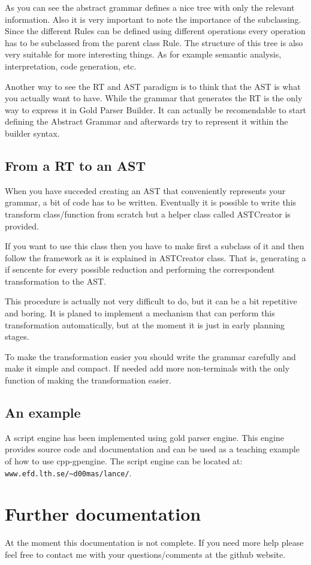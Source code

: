 \documentclass[a4paper]{article}
\begin{document}
As you can see the abstract grammar defines a nice tree with only the relevant information. Also it is very important to note the importance of the subclassing. Since the different Rules can be defined using different operations every operation has to be subclassed from the parent class Rule. The structure of this tree is also very suitable for more interesting things. As for example semantic analysis, interpretation, code generation, etc.

Another way to see the RT and AST paradigm is to think that the AST is what you actually want to have. While the grammar that generates the RT is the only way to express it in Gold Parser Builder. It can actually be recomendable to start defining the Abstract Grammar and afterwards try to represent it within the builder syntax.

\subsection {From a RT to an AST}
When you have succeded creating an AST that conveniently represents your grammar, a bit of code has to be written. Eventually it is possible to write this transform class/function from scratch but a helper class called ASTCreator is provided. 

If you want to use this class then you have to make first a subclass of it and then follow the framework as it is explained in ASTCreator class. That is, generating a if sencente for every possible reduction and performing the correspondent transformation to the AST.

This procedure is actually not very difficult to do, but it can be a bit repetitive and boring. It is planed to implement a mechanism that can perform this transformation automatically, but at the moment it is just in early planning stages.

To make the transformation easier you should write the grammar carefully and make it simple and compact. If needed add more non-terminals with the only function of making the transformation easier.

\subsection {An example}
A script engine has been implemented using gold parser engine. This engine provides source code and documentation and can be used as a teaching example of how to use cpp-gpengine. The script engine can be located at: \verb|www.efd.lth.se/~d00mas/lance/|.

\section {Further documentation}
At the moment this documentation is not complete. If you need more help please feel free to contact me with your questions/comments at the github website.
\end{document}
